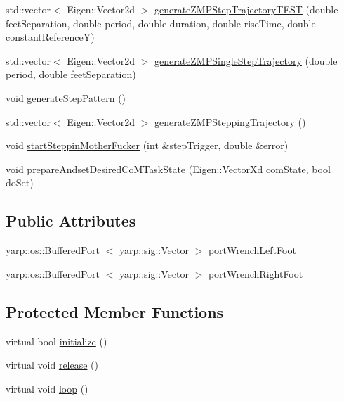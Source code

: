\begin{DoxyCompactItemize}
\item 
std\-::vector$<$ \-Eigen\-::\-Vector2d $>$ \hyperlink{classWalkingClient_a70b2375134ae55a041fbf30180ea3a8f}{generate\-Z\-M\-P\-Step\-Trajectory\-T\-E\-S\-T} (double feet\-Separation, double period, double duration, double rise\-Time, double constant\-Reference\-Y)
\item 
std\-::vector$<$ \-Eigen\-::\-Vector2d $>$ \hyperlink{classWalkingClient_ab5bd1eceec03d8b88ffe2b6b07d981c0}{generate\-Z\-M\-P\-Single\-Step\-Trajectory} (double period, double feet\-Separation)
\item 
void \hyperlink{classWalkingClient_a51ac091a481766030dcedf7327122c19}{generate\-Step\-Pattern} ()
\item 
std\-::vector$<$ \-Eigen\-::\-Vector2d $>$ \hyperlink{classWalkingClient_aebee5b71a15e0b990fb3dad36f335eb5}{generate\-Z\-M\-P\-Stepping\-Trajectory} ()
\item 
void \hyperlink{classWalkingClient_aa1e8544a58d084c70c7e8a4a9c247de5}{start\-Steppin\-Mother\-Fucker} (int \&step\-Trigger, double \&error)
\item 
void \hyperlink{classWalkingClient_aad39a3836319f9b7258d8eb129776b47}{prepare\-Andset\-Desired\-Co\-M\-Task\-State} (\-Eigen\-::\-Vector\-Xd com\-State, bool do\-Set)
\end{DoxyCompactItemize}
\subsection*{\-Public \-Attributes}
\begin{DoxyCompactItemize}
\item 
yarp\-::os\-::\-Buffered\-Port\*
$<$ yarp\-::sig\-::\-Vector $>$ \hyperlink{classWalkingClient_a88ee63ff6a341eccd458d24700383457}{port\-Wrench\-Left\-Foot}
\item 
yarp\-::os\-::\-Buffered\-Port\*
$<$ yarp\-::sig\-::\-Vector $>$ \hyperlink{classWalkingClient_a96321dc60e84c193f2dea6e85983ca67}{port\-Wrench\-Right\-Foot}
\end{DoxyCompactItemize}
\subsection*{\-Protected \-Member \-Functions}
\begin{DoxyCompactItemize}
\item 
virtual bool \hyperlink{classWalkingClient_aba6a03fe29a4e947bc6bc0c09a713b2a}{initialize} ()
\item 
virtual void \hyperlink{classWalkingClient_a3b36da9d7649865a13c9318dd73ebc7e}{release} ()
\item 
virtual void \hyperlink{classWalkingClient_afd997bb00534c57fe1b0d5f37f207386}{loop} ()
\end{DoxyCompactItemize}
